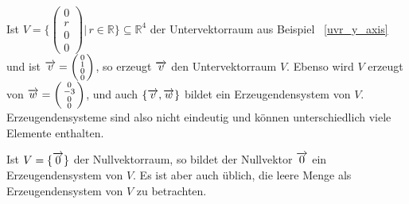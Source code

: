 \begin{beispiel} Ist $V = \{ \left( \begin{smallmatrix} 0 \\ r \\ 0 \\ 0 \end{smallmatrix} \right) \vert \, 
r \in \mathbb R\} \subseteq \mathbb R^4$ der Untervektorraum aus Beispiel ~\ref{uvr_y_axis} und ist
$\overrightarrow{v} = \left( \begin{smallmatrix} 0 \\ 1 \\ 0 \\ 0 \end{smallmatrix} \right)$, 
so erzeugt $\overrightarrow{v}$ den Untervektorraum $V$. Ebenso wird $V$ erzeugt von
$\overrightarrow{w} = \left( \begin{smallmatrix} 0 \\ -3 \\ 0 \\ 0 \end{smallmatrix} \right)$, und auch 
$\{ \overrightarrow{v}, \overrightarrow{w} \}$ bildet ein Erzeugendensystem von $V$.
Erzeugendensysteme sind also nicht eindeutig und können unterschiedlich viele Elemente enthalten.
\end{beispiel}

\begin{beispiel}\label{uvr_null_erz} 
Ist $V = \{ \overrightarrow{0} \}$ der Nullvektorraum, so bildet der Nullvektor 
$\overrightarrow{0}$ ein Erzeugendensystem von $V$. Es ist aber auch üblich, die leere Menge als 
Erzeugendensystem von $V$ zu betrachten. 
\end{beispiel}


